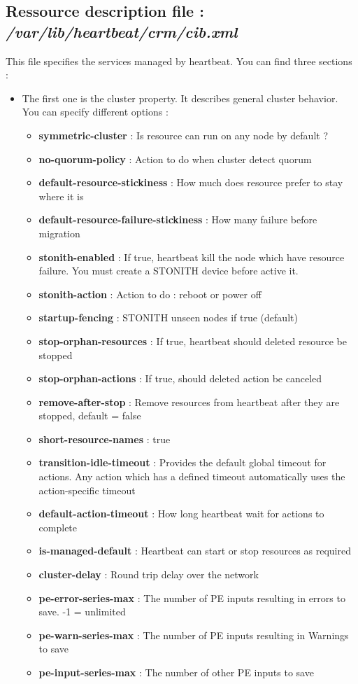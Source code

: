 \documentclass[a4paper,10pt]{report}
\begin{document}
\subsection{Ressource description file : \textit{/var/lib/heartbeat/crm/cib.xml}}
This file specifies the services managed by heartbeat. You can find three sections :
\begin{itemize}
\item The first one is the cluster property. It describes general cluster behavior. You can specify different options :

\begin{itemize}
\item \textbf{symmetric-cluster} : Is resource can run on any node by default ?
\item \textbf{no-quorum-policy} : Action to do when cluster detect quorum
\item \textbf{default-resource-stickiness} : How much does resource prefer to stay where it is
\item \textbf{default-resource-failure-stickiness} : How many failure before migration
\item \textbf{stonith-enabled} : If true, heartbeat kill the node which have resource failure. You must create a STONITH device before active it.
\item \textbf{stonith-action} : Action to do : reboot or power off
\item \textbf{startup-fencing} : STONITH unseen nodes if true (default)
\item \textbf{stop-orphan-resources} : If true, heartbeat should deleted resource be stopped
\item \textbf{stop-orphan-actions} : If true, should deleted action be canceled
\item \textbf{remove-after-stop} : Remove resources from heartbeat after they are stopped, default = false
\item \textbf{short-resource-names} : true
\item \textbf{transition-idle-timeout} : Provides the default global timeout for actions. Any action which has a defined timeout automatically
uses the action-specific timeout
\item \textbf{default-action-timeout} : How long heartbeat wait for actions to complete
\item \textbf{is-managed-default} : Heartbeat can start or stop resources as required
\item \textbf{cluster-delay} : Round trip delay over the network
\item \textbf{pe-error-series-max} : The number of PE inputs resulting in errors to save. -1 = unlimited
\item \textbf{pe-warn-series-max} : The number of PE inputs resulting in Warnings to save
\item \textbf{pe-input-series-max} : The number of other PE inputs to save
\end{itemize}


\end{itemize}
\end{document}
